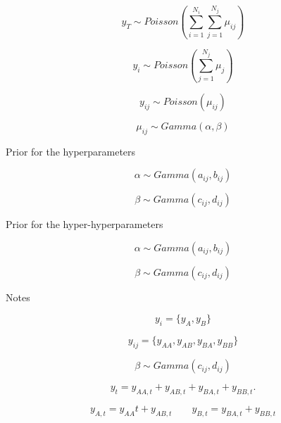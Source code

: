 	\begin{equation}\nonumber
	y_T \sim Poisson(\sum_{i=1}^{N_i} \sum_{j=1}^{N_j}\mu_{ij}) 
	\end{equation}

	\begin{equation}\nonumber
	y_i \sim Poisson( \sum_{j=1}^{N_j}\mu_{j}) 
	\end{equation}
	
	\begin{equation}\nonumber
	y_{ij} \sim Poisson(\mu_{ij}) 
	\end{equation}

	\begin{equation}\nonumber
	\mu_{ij} \sim Gamma(\alpha,\beta) 
	\end{equation}

	Prior for the hyperparameters

	\begin{equation}\nonumber
	\alpha \sim Gamma(a_{ij},b_{ij}) 
	\end{equation}

	\begin{equation}\nonumber
	\beta \sim Gamma(c_{ij},d_{ij}) 
	\end{equation}
	
	Prior for the hyper-hyperparameters

	\begin{equation}\nonumber
	\alpha \sim Gamma(a_{ij},b_{ij}) 
	\end{equation}

	\begin{equation}\nonumber
	\beta \sim Gamma(c_{ij},d_{ij}) 
	\end{equation}

Notes

\begin{equation*}
y_i = \{y_A,y_B\}
\end{equation*}

\begin{equation*}
y_{ij} = \{y_{AA},y_{AB},y_{BA},y_{BB}\}
\end{equation*}

\begin{equation*}
\beta \sim Gamma(c_{ij},d_{ij}) 
\end{equation*}

\begin{equation*}
y_{t}=y_{AA,t}+y_{AB,t}+y_{BA,t}+y_{BB,t}.
\end{equation*}

\begin{equation*} y_{A,t}=y_{AA}{t}+y_{AB,t}\quad \quad y_{B,t}=y_{BA,t}+y_{BB,t}
\tag{10.4}
\end{equation*}

